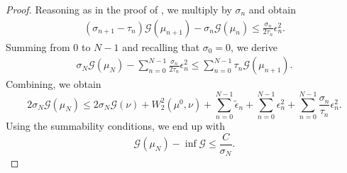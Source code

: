 \documentclass[11pt]{article}
\newcommand{\cG}{\mathcal{G}}
\numberwithin{equation}{section}
\begin{document}
\begin{proof}
	Reasoning as in the proof of , we multiply by $\sigma_n$ and obtain
	\begin{equation}
		\begin{aligned}
			(\sigma_{n+1}-\tau_n)\cG(\mu_{n+1}) - \sigma_{n}\cG(\mu_n) \leq \frac{\sigma_n}{2\tau_n}\epsilon_{n}^2.
		\end{aligned}
	\end{equation}
	Summing from $0$ to $N-1$ and recalling that $\sigma_0=0$, we derive
	\begin{equation}
		\begin{aligned}
			\sigma_{N}\cG(\mu_N) - \sum_{n=0}^{N-1}\frac{\sigma_n}{2\tau_n}\epsilon_{n}^2 \leq \sum_{n=0}^{N-1}\tau_n \cG(\mu_{n+1}).
		\end{aligned}
	\end{equation}
	Combining, we obtain
	\begin{equation}\label{eq:err2_for_rates3}
		2\sigma_N \mathcal{G}(\mu_N)\leq 2\sigma_N \cG(\nu)+W_2^2(\mu^0,\nu)+\sum_{n=0}^{N-1}\tilde{\epsilon}_n+\sum_{n=0}^{N-1}\epsilon_n^2+\sum_{n=0}^{N-1}\frac{\sigma_n}{\tau_n}\epsilon_{n}^2.
	\end{equation}
	Using the summability conditions, we end up with
	\begin{equation}\label{eq:rate_mun}
		\cG(\mu_N) - \inf \cG \leq \frac{C}{\sigma_N}.
	\end{equation}
\end{proof}
\end{document}
